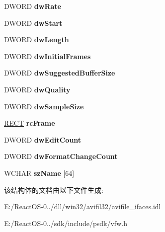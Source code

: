 \begin{DoxyCompactItemize}
D\+W\+O\+RD {\bfseries dw\+Rate}
\item 
\mbox{\label{struct___a_v_i_s_t_r_e_a_m_i_n_f_o_w_a47eaaceb8b6f92d8c7cdb08ec73b2493}} 
D\+W\+O\+RD {\bfseries dw\+Start}
\item 
\mbox{\label{struct___a_v_i_s_t_r_e_a_m_i_n_f_o_w_ac06f3b5b27e0d2bde96c0a687de353f8}} 
D\+W\+O\+RD {\bfseries dw\+Length}
\item 
\mbox{\label{struct___a_v_i_s_t_r_e_a_m_i_n_f_o_w_a7548ae25121842a6223ed4e23e06c9f4}} 
D\+W\+O\+RD {\bfseries dw\+Initial\+Frames}
\item 
\mbox{\label{struct___a_v_i_s_t_r_e_a_m_i_n_f_o_w_a2a31e9448f3520826bc7c9b21eb971b4}} 
D\+W\+O\+RD {\bfseries dw\+Suggested\+Buffer\+Size}
\item 
\mbox{\label{struct___a_v_i_s_t_r_e_a_m_i_n_f_o_w_a6d230ae638ce444dd13c98033ee3b4ec}} 
D\+W\+O\+RD {\bfseries dw\+Quality}
\item 
\mbox{\label{struct___a_v_i_s_t_r_e_a_m_i_n_f_o_w_aff0a9c5127198467d2f498e08580da34}} 
D\+W\+O\+RD {\bfseries dw\+Sample\+Size}
\item 
\mbox{\label{struct___a_v_i_s_t_r_e_a_m_i_n_f_o_w_a51a05ce5a1dbabf15db16531cdd21095}} 
\hyperlink{structtag_r_e_c_t}{R\+E\+CT} {\bfseries rc\+Frame}
\item 
\mbox{\label{struct___a_v_i_s_t_r_e_a_m_i_n_f_o_w_aa82411f7eeb04e54186bf115815c1f62}} 
D\+W\+O\+RD {\bfseries dw\+Edit\+Count}
\item 
\mbox{\label{struct___a_v_i_s_t_r_e_a_m_i_n_f_o_w_ad08b9456da6f48298d744d45178f645a}} 
D\+W\+O\+RD {\bfseries dw\+Format\+Change\+Count}
\item 
\mbox{\label{struct___a_v_i_s_t_r_e_a_m_i_n_f_o_w_a8eec59bfba8ce65dc0513f82a290adc7}} 
W\+C\+H\+AR {\bfseries sz\+Name} \mbox{[}64\mbox{]}
\end{DoxyCompactItemize}


该结构体的文档由以下文件生成\+:\begin{DoxyCompactItemize}
\item 
E\+:/\+React\+O\+S-\/0../dll/win32/avifil32/avifile\+\_\+ifaces.\+idl\item 
E\+:/\+React\+O\+S-\/0../sdk/include/psdk/vfw.\+h\end{DoxyCompactItemize}
